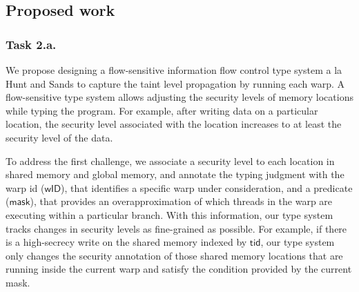 \subsection{Proposed work}
\subsubsection{Task 2.a.} 
%
We propose designing a flow-sensitive information flow control type system a la Hunt and Sands\cite{hunt2006popl}  to capture the taint level propagation by running each warp.
%
A flow-sensitive type system allows adjusting the security levels of memory locations while typing the program.
%
For example, after writing data on a particular location, the security level associated with the location increases to at least the security level of the data.
%

To address the first challenge, we associate a security level to each location in shared memory and global memory, and annotate the typing judgment with the warp id ($\mathsf{wID}$), that identifies a specific warp under consideration, and a predicate ($\mathsf{mask}$), that provides an overapproximation of which threads in the warp are executing within a particular branch. 
% 
With this information, our type system tracks changes in security levels as fine-grained  as possible.
For example, if there is a high-secrecy write on the shared memory indexed by $\mathsf{tid}$, our type system only changes the security annotation of those shared memory locations that are running inside the current warp and satisfy the condition provided by the current mask.


